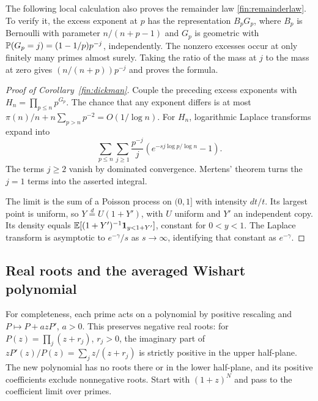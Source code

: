 The following local calculation also proves the remainder law
\eqref{fin:remainderlaw}.
To verify it, the excess exponent at $p$ has the representation
$B_pG_p$, where $B_p$ is Bernoulli with parameter $n/(n+p-1)$ and
$G_p$ is geometric with $\mathbb P(G_p=j)=(1-1/p)p^{-j}$, independently.
The nonzero excesses occur at only finitely many primes almost surely.
Taking the ratio of the mass at $j$ to the mass at zero gives
$(n/(n+p))p^{-j}$ and proves the formula.

\begin{proof}[Proof of Corollary~\ref{fin:dickman}]
Couple the preceding excess exponents with
$H_n=\prod_{p\le n}p^{G_p}$.  The chance that any exponent differs is
at most
$\pi(n)/n+n\sum_{p>n}p^{-2}=O(1/\log n)$.
For $H_n$, logarithmic Laplace transforms expand into
\[
 \sum_{p\le n}\sum_{j\ge1}\frac{p^{-j}}j
       (e^{-sj\log p/\log n}-1).
\]
The terms $j\ge2$ vanish by dominated convergence.  Mertens' theorem
turns the $j=1$ terms into the asserted integral.

The limit is the sum of a Poisson process on $(0,1]$ with intensity
$dt/t$.  Its largest point is uniform, so
$Y\overset d=U(1+Y')$, with $U$ uniform and $Y'$ an independent copy.
Its density equals $\mathbb E[(1+Y')^{-1}{\bf1}_{y<1+Y'}]$, constant for
$0<y<1$.  The Laplace transform is asymptotic to $e^{-\gamma}/s$ as
$s\to\infty$, identifying that constant as $e^{-\gamma}$.
\end{proof}

\subsection{Real roots and the averaged Wishart polynomial}\label{finapp:matrix}
For completeness, each prime acts on a polynomial by positive rescaling
and $P\mapsto P+a zP'$, $a>0$.  This preserves negative real roots:
for $P(z)=\prod_j(z+r_j)$, $r_j>0$, the imaginary part of
$zP'(z)/P(z)=\sum_j z/(z+r_j)$ is strictly positive in the upper
half-plane.  The new polynomial has no roots there or in the lower
half-plane, and its positive coefficients exclude nonnegative roots.
Start with $(1+z)^N$ and pass to the coefficient limit over primes.


